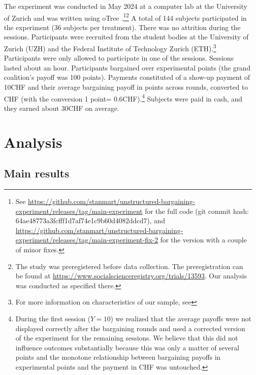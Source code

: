 \documentclass[12pt]{article}
\begin{document}
The experiment was conducted in May 2024 at a computer lab at the University of Zurich and was written using oTree \parencite{CHEN201688}.\footnote{See \href{https://github.com/stanmart/unstructured-bargaining-experiment/releases/tag/main-experiment}{https://github.com/stanmart/unstructured-bargaining-experiment/releases/tag/main-experiment} for the full code (git commit hash: 64ae48773a3fcfff1d7af74e1c9b60d4082ddcd7), and \href{https://github.com/stanmart/unstructured-bargaining-experiment/releases/tag/main-experiment-fix-2}{https://github.com/stanmart/unstructured-bargaining-experiment/releases/tag/main-experiment-fix-2} for the version with a couple of minor fixes.}\footnote{The study was preregistered before data collection. The preregistration can be found at \href{https://www.socialscienceregistry.org/trials/13593}{https://www.socialscienceregistry.org/trials/13593}. Our analysis was conducted as specified there.} A total of 144 subjects participated in the experiment (36 subjects per treatment). There was no attrition during the sessions. Participants were recruited from the student bodies at the University of Zurich (UZH) and the Federal Institute of Technology Zurich (ETH).\footnote{For more information on characteristics of our sample, see } Participants were only allowed to participate in one of the sessions. Sessions lasted about an hour. Participants bargained over experimental points (the grand coalition's payoff was 100 points). Payments constituted of a show-up payment of 10CHF and their average bargaining payoff in points across rounds, converted to CHF (with the conversion 1 point= 0.6CHF).\footnote{During the first session ($Y = 10$) we realized that the average payoffs were not displayed correctly after the bargaining rounds and used a corrected version of the experiment for the remaining sessions. We believe that this did not influence outcomes substantially  because this was only a matter of several points and the monotone relationship between bargaining payoffs in experimental points and the payment in CHF was untouched.} Subjects were paid in cash, and they earned about 30CHF on average. 
 



\section{Analysis} \label{sec:analysis}

\subsection{Main results}
\end{document}
